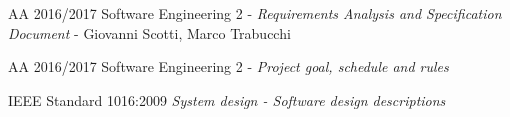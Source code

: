 \begin{thebibliography}{9}

	AA 2016/2017 Software Engineering 2 - \emph{Requirements Analysis and Specification Document} - Giovanni Scotti, Marco Trabucchi
	
	AA 2016/2017 Software Engineering 2 - \emph{Project goal, schedule and rules}
	
	IEEE Standard 1016:2009 \emph{System design - Software design descriptions}

\end{thebibliography}